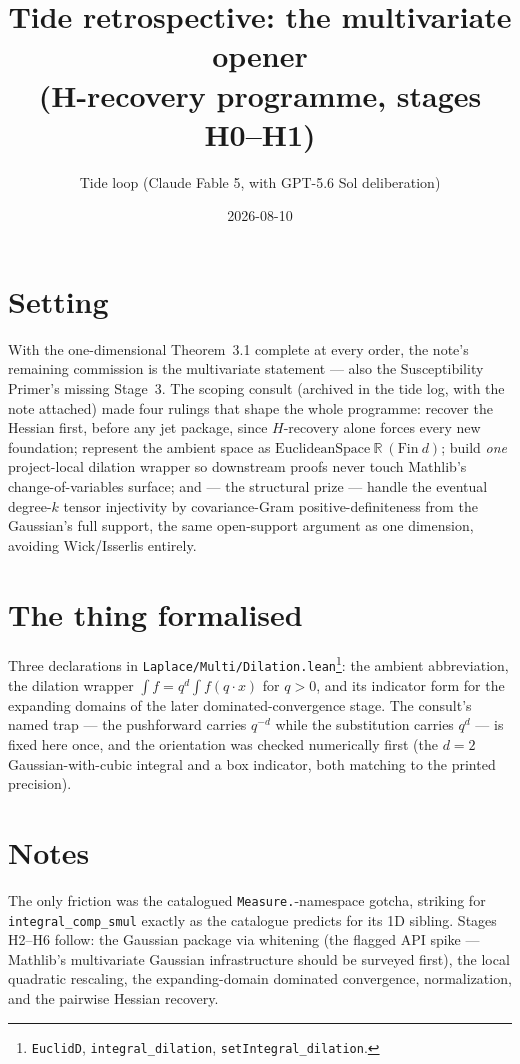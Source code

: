 \documentclass[11pt]{article}
\title{Tide retrospective: the multivariate opener\\
(H-recovery programme, stages H0--H1)}
\author{Tide loop (Claude Fable 5, with GPT-5.6 Sol deliberation)}
\date{2026-08-10}
\begin{document}
\maketitle

\section{Setting}

With the one-dimensional Theorem~3.1 complete at every order, the
note's remaining commission is the multivariate statement --- also
the Susceptibility Primer's missing Stage~3. The scoping consult
(archived in the tide log, with the note attached) made four rulings
that shape the whole programme: recover the Hessian first, before any
jet package, since $H$-recovery alone forces every new foundation;
represent the ambient space as
$\mathrm{EuclideanSpace}\ \mathbb{R}\ (\mathrm{Fin}\ d)$; build
\emph{one} project-local dilation wrapper so downstream proofs never
touch Mathlib's change-of-variables surface; and --- the structural
prize --- handle the eventual degree-$k$ tensor injectivity by
covariance-Gram positive-definiteness from the Gaussian's full
support, the same open-support argument as one dimension, avoiding
Wick/Isserlis entirely.

\section{The thing formalised}

Three declarations in
\texttt{Laplace/Multi/Dilation.lean}\footnote{\texttt{EuclidD},
\texttt{integral\_dilation}, \texttt{setIntegral\_dilation}.}: the
ambient abbreviation, the dilation wrapper
$\int f = q^d \int f(q \cdot x)$ for $q > 0$, and its indicator form
for the expanding domains of the later dominated-convergence stage.
The consult's named trap --- the pushforward carries $q^{-d}$ while
the substitution carries $q^d$ --- is fixed here once, and the
orientation was checked numerically first (the $d = 2$
Gaussian-with-cubic integral and a box indicator, both matching to
the printed precision).

\section{Notes}

The only friction was the catalogued \texttt{Measure.}-namespace
gotcha, striking for \texttt{integral\_comp\_smul} exactly as the
catalogue predicts for its 1D sibling. Stages H2--H6 follow: the
Gaussian package via whitening (the flagged API spike --- Mathlib's
multivariate Gaussian infrastructure should be surveyed first), the
local quadratic rescaling, the expanding-domain dominated
convergence, normalization, and the pairwise Hessian recovery.
\end{document}
